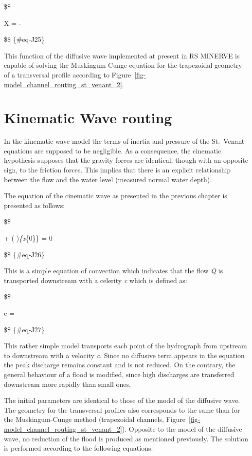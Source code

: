 \documentclass[
  letterpaper,
  DIV=11,
  numbers=noendperiod]{scrreprt}
\begin{document}
\$\$

X =  -

\$\$ \{\#eq-J25\}

This function of the diffusive wave implemented at present in RS MINERVE
is capable of solving the Muskingum-Cunge equation for the trapezoidal
geometry of a transversal profile according to
Figure~\ref{fig-model_channel_routing_st_venant_2}.

\hypertarget{sec-model_channel_routing_kinematic}{%
\section{Kinematic Wave
routing}\label{sec-model_channel_routing_kinematic}}

In the kinematic wave model the terms of inertia and pressure of the
St.~Venant equations are supposed to be negligible. As a consequence,
the cinematic hypothesis supposes that the gravity forces are identical,
though with an opposite sign, to the friction forces. This implies that
there is an explicit relationship between the flow and the water level
(measured normal water depth).

The equation of the cinematic wave as presented in the previous chapter
is presented as follows:

\$\$

 + \left( 
\right)\emph{\{x}\{0\}\} \cdot {} = 0

\$\$ \{\#eq-J26\}

This is a simple equation of convection which indicates that the flow
\emph{Q} is transported downstream with a celerity \emph{c} which is
defined as:

\$\$

c = 

\$\$ \{\#eq-J27\}

This rather simple model transports each point of the hydrograph from
upstream to downstream with a velocity \emph{c}. Since no diffusive term
appears in the equation the peak discharge remains constant and is not
reduced. On the contrary, the general behaviour of a flood is modified,
since high discharges are transferred downstream more rapidly than small
ones.

The initial parameters are identical to those of the model of the
diffusive wave. The geometry for the transversal profiles also
corresponds to the same than for the Muskingum-Cunge method (trapezoidal
channels, Figure~\ref{fig-model_channel_routing_st_venant_2}). Opposite
to the model of the diffusive wave, no reduction of the flood is
produced as mentioned previously. The solution is performed according to
the following equations:
\end{document}
